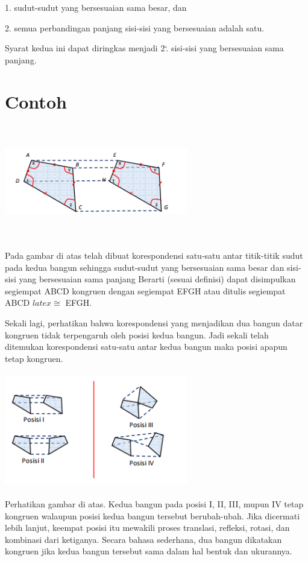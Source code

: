 \documentclass[11pt,fleqn]{book} %
\begin{document}
1. sudut-sudut yang bersesuaian sama besar, dan

2. semua perbandingan panjang sisi-sisi yang bersesuaian adalah satu.

Syarat kedua ini dapat diringkas menjadi 2`. sisi-sisi yang bersesuaian sama panjang. 


\section{Contoh}
\includegraphics[width = 8cm, height= 5cm]{Pictures/1.png}
 
Pada gambar di atas telah dibuat korespondensi satu-satu antar titik-titik sudut pada kedua bangun sehingga sudut-sudut yang bersesuaian sama besar dan sisi-sisi yang bersesuaian sama panjang Berarti (sesuai definisi) dapat disimpulkan segiempat
ABCD kongruen dengan segiempat EFGH atau ditulis segiempat ABCD $latex\cong $ EFGH.

Sekali lagi, perhatikan bahwa korespondensi yang menjadikan dua bangun datar kongruen tidak terpengaruh oleh posisi kedua bangun. Jadi sekali telah ditemukan korespondensi satu-satu antar kedua bangun maka posisi apapun tetap kongruen. 

\includegraphics[width = 8cm, height= 5cm]{Pictures/2.png}

Perhatikan gambar di atas. Kedua bangun pada posisi I, II, III, mupun IV tetap
kongruen walaupun posisi kedua bangun tersebut berubah-ubah. Jika dicermati lebih
lanjut, keempat posisi itu mewakili proses translasi, refleksi, rotasi, dan kombinasi
dari ketiganya. Secara bahasa sederhana, dua bangun dikatakan kongruen jika kedua
bangun tersebut sama dalam hal bentuk dan ukurannya. 
\end{document}
